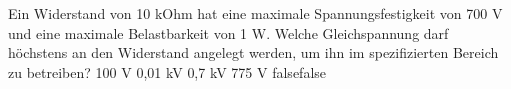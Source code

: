     {Ein Widerstand von 10 kOhm hat eine maximale Spannungsfestigkeit von 700 V und eine maximale Belastbarkeit von 1 W. Welche Gleichspannung darf höchstens an den Widerstand angelegt werden, um ihn im spezifizierten Bereich zu betreiben?}
    {100 V}
    {0,01 kV}
    {0,7 kV}
    {775 V}
    {false}{false}